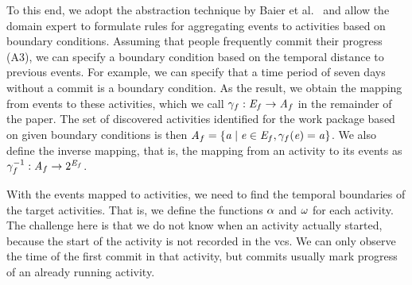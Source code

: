 To this end, we adopt the abstraction technique by Baier et al.~\cite{baier2014bridging} and allow the domain expert to formulate rules for aggregating events to activities based on boundary conditions. Assuming that people frequently commit their progress (A3), we can specify a boundary condition based on the temporal distance to previous events. For example, we can specify that a time period of seven days without a commit is a boundary condition. %
As the result, we obtain the mapping from events to these activities, which we call $\gamma_{f} : \mathit{E}_{f} \rightarrow \mathit{A}_{f}$ in the remainder of the paper. The set of discovered activities identified for the work package based on given boundary conditions is then $\mathit{A}_{f} = \lbrace \mathit{a} \mid \mathit{e} \in \mathit{E}_{f}, \gamma_{f}(\mathit{e}) = \mathit{a} \rbrace$. We also define the inverse mapping, that is, the mapping from an activity to its events as $\gamma_{f}^{-1} : \mathit{A}_{f} \rightarrow 2^{\mathit{E}_{f}}$.

With the events mapped to activities, we need to find the temporal boundaries of the target activities. That is, we define the functions $\alpha$ and $\omega$ for each activity. The challenge here is that we do not know when an activity actually started, because the start of the activity is not recorded in the \gls{vcs}. We can only observe the time of the first commit in that activity, but commits usually mark progress of an already running activity.

